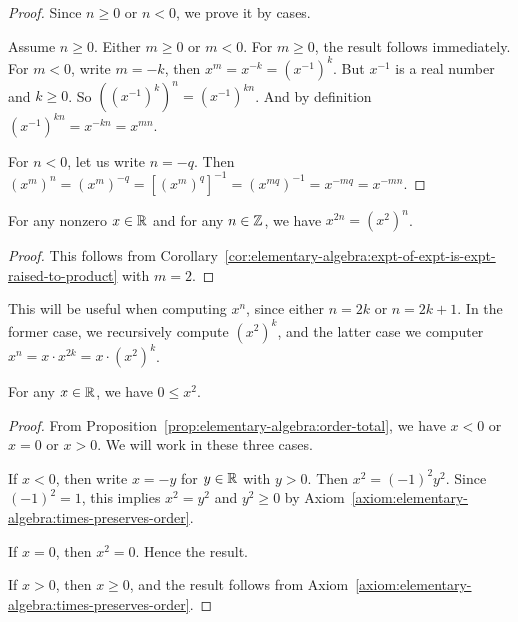 \begin{proof}
Since $n\geq 0$ or $n < 0$, we prove it by cases.

Assume $n\geq 0$. Either $m\geq0$ or $m < 0$. For $m\geq 0$,
the result follows immediately. For $m < 0$, write $m = -k$, then
$x^{m} = x^{-k} = (x^{-1})^{k}$. But $x^{-1}$ is a real number and $k\geq0$.
So $((x^{-1})^{k})^{n}=(x^{-1})^{kn}$. And by definition $(x^{-1})^{kn}=x^{-kn}=x^{mn}$.

For $n < 0$, let us write $n=-q$. Then $(x^{m})^{n} = (x^{m})^{-q} = [(x^{m})^{q}]^{-1}=(x^{mq})^{-1}=x^{-mq}=x^{-mn}$.
\end{proof}

\begin{corollary}
For any nonzero $x\in\mathbb{R}$ and for any $n\in\mathbb{Z}$, we have $x^{2n} = (x^{2})^{n}$.
\end{corollary}

\begin{proof}
This follows from Corollary~\ref{cor:elementary-algebra:expt-of-expt-is-expt-raised-to-product}
with $m=2$.
\end{proof}

\begin{remark}
This will be useful when computing $x^{n}$, since either $n=2k$ or
$n=2k+1$. In the former case, we recursively compute $(x^{2})^{k}$, and
the latter case we computer $x^{n} = x\cdot x^{2k} = x\cdot (x^{2})^{k}$.
\end{remark}

\begin{proposition}
For any $x\in\mathbb{R}$, we have $0\leq x^{2}$.
\end{proposition}

\begin{proof}
From Proposition~\ref{prop:elementary-algebra:order-total},
we have $x < 0$ or $x = 0$ or $x > 0$. We will work in these three
cases.

If $x < 0$, then write $x = -y$ for $y\in\mathbb{R}$ with $y > 0$. Then $x^{2} = (-1)^{2}y^{2}$.
Since $(-1)^{2} = 1$, this implies $x^{2} = y^{2}$ and $y^{2}\geq 0$ by Axiom~\ref{axiom:elementary-algebra:times-preserves-order}.

If $x = 0$, then $x^{2}=0$. Hence the result.

If $x > 0$, then $x\geq 0$, and the result follows from Axiom~\ref{axiom:elementary-algebra:times-preserves-order}.
\end{proof}


